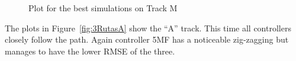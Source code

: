\documentclass[symmetry,article,submit,moreauthors,pdftex]{Definitions/mdpi}
\begin{document}
\begin{figure}[H]
    \widefigure
     \centering
     \caption{Plot for the best simulations on Track M}
        \label{fig:3RutasM}
\end{figure}
\begin{paracol}{2}
\linenumbers
\switchcolumn

The plots in Figure~\ref{fig:3RutasA} show the ``A'' track. This time all
controllers closely follow the path. Again controller 5MF has a noticeable
zig-zagging but manages to have the lower RMSE of the three.

\end{paracol}
\end{document}
